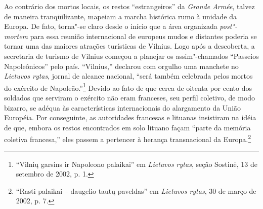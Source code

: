 Ao contrário dos mortos locais, os restos ``estrangeiros'' da
\emph{Grande Armée}, talvez de maneira tranqüilizante, mapeiam a marcha
histórica rumo à unidade da Europa. De fato, torna"-se claro desde o
início que a área organizada \emph{post"-mortem} para essa reunião
internacional de europeus mudos e distantes poderia se tornar uma das
maiores atrações turísticas de Vilnius. Logo após a descoberta, a
secretaria de turismo de Vilnius começou a planejar os assim"-chamados
``Passeios Napoleônicos'' pelo país. ``Vilnius,'' declarou com orgulho
uma manchete no \emph{Lietuvos rytas}, jornal de alcance nacional,
``será também celebrada pelos mortos do exército de
Napoleão.''\footnote{``Vilnių garsins ir Napoleono palaikai'' em
  \emph{Lietuvos rytas}, seção Sostinė, 13 de setembro de 2002, p. 1.}
Devido ao fato de que cerca de oitenta por cento dos soldados que
serviram o exército não eram franceses, seu perfil coletivo, de modo
bizarro, se adéqua às características internacionais do alargamento da
União Européia. Por conseguinte, as autoridades francesas e lituanas
insistiram na idéia de que, embora os restos encontrados em solo lituano
façam ``parte da memória coletiva francesa,'' eles passem a pertencer à
herança transnacional da Europa.\footnote{``Rasti palaikai -- daugelio
  tautų paveldas'' em \emph{Lietuvos rytas}, 30 de março de 2002, p. 7.}

